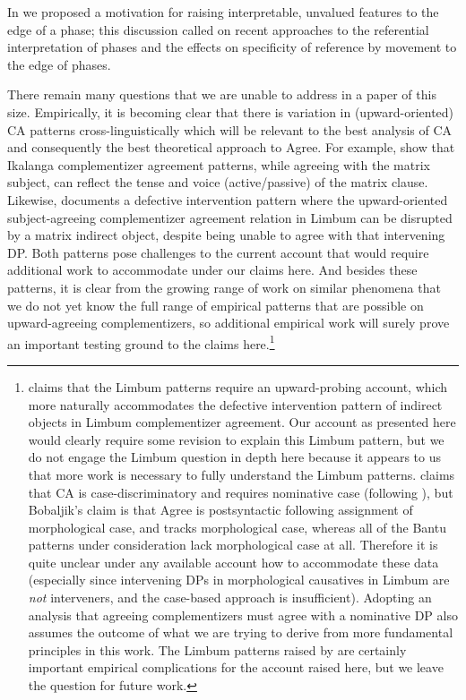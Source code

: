 \documentclass[output=paper
,modfonts
,nonflat
]{langsci/langscibook}
\begin{document}
In  we proposed a motivation for raising interpretable, unvalued features to the edge of a phase; this discussion called on recent approaches to the referential interpretation of phases and the effects on specificity of reference by movement to the edge of phases. 
        
There remain many questions that we are unable to address in a paper of this size. Empirically, it is becoming clear that there is variation in (upward-oriented) CA patterns cross-linguistically which will be relevant to the best analysis of CA and consequently the best theoretical approach to Agree. For example, \citet{LetsholoSafir:2017} show that Ikalanga complementizer agreement patterns, while agreeing with the matrix subject, can reflect the tense and voice (active/passive) of the matrix clause. Likewise, \citet{Nformi:2017} documents a defective intervention pattern where the upward-oriented subject-agreeing complementizer agreement relation in Limbum can be disrupted by a matrix indirect object, despite being unable to agree with that intervening DP. Both patterns pose challenges to the current account that would require additional work to accommodate under our claims here. And besides these patterns, it is clear from the growing range of work on similar phenomena that we do not yet know the full range of empirical patterns that are possible on upward-agreeing complementizers, so additional empirical work will surely prove an important testing ground to the claims here.\footnote{\citet{Nformi:2017} claims that the Limbum patterns require an upward-probing account, which more naturally accommodates the defective intervention pattern of indirect objects in Limbum complementizer agreement. Our account as presented here would clearly require some revision to explain this Limbum pattern, but we do not engage the Limbum question in depth here because it appears to us that more work is necessary to fully understand the Limbum patterns. \citet{Nformi:2017} claims that CA is case-discriminatory and requires nominative case (following \citealt{Bobaljik:2008}), but Bobaljik's claim is that Agree is postsyntactic following assignment of morphological case, and tracks morphological case, whereas all of the Bantu patterns under consideration lack morphological case at all. Therefore it is quite unclear under any available account how to accommodate these data (especially since intervening DPs in morphological causatives in Limbum are \textit{not} interveners, and the case-based approach is insufficient). Adopting an analysis that agreeing complementizers must agree with a nominative DP also assumes the outcome of what we are trying to derive from more fundamental principles in this work. The Limbum patterns raised by \citet{Nformi:2017} are certainly important empirical complications for the account raised here, but we leave the question for future work.}\largerpage[1.75]
\end{document}
